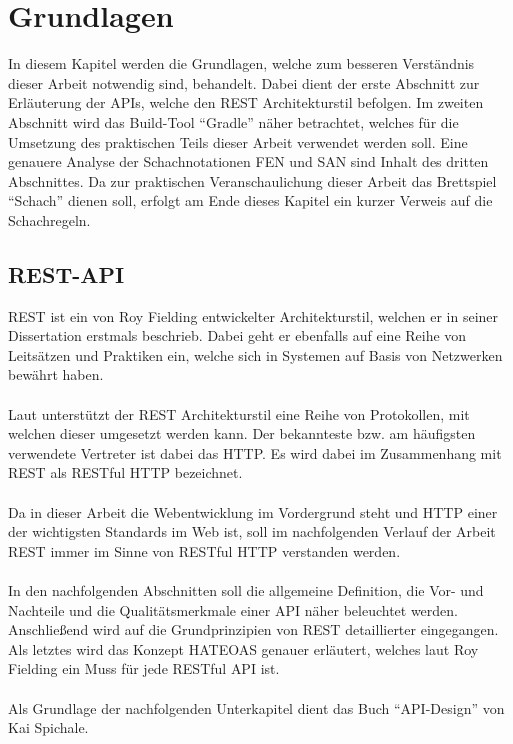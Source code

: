 
\chapter{Grundlagen}\label{chap:basics}
In diesem Kapitel werden die Grundlagen, welche zum besseren Verständnis dieser Arbeit notwendig sind, behandelt. Dabei dient der erste Abschnitt zur Erläuterung der \glspl{API}, welche den \gls{REST} Architekturstil befolgen. Im zweiten Abschnitt wird das Build-Tool \enquote{Gradle} näher betrachtet, welches für die Umsetzung des praktischen Teils dieser Arbeit verwendet werden soll. Eine genauere Analyse der Schachnotationen \gls{FEN} und \gls{SAN} sind Inhalt des dritten Abschnittes. Da zur praktischen Veranschaulichung dieser Arbeit das Brettspiel \enquote{Schach} dienen soll, erfolgt am Ende dieses Kapitel ein kurzer Verweis auf die Schachregeln.

\section{REST-API}
\gls{REST} ist ein von Roy Fielding entwickelter Architekturstil, welchen er in seiner Dissertation \cite{dissertationFielding} erstmals beschrieb. Dabei geht er ebenfalls auf eine Reihe von Leitsätzen und Praktiken ein, welche sich in Systemen auf Basis von Netzwerken bewährt haben.\\
\\
Laut \cite[143]{apiDesign} unterstützt der \gls{REST} Architekturstil eine Reihe von Protokollen, mit welchen dieser umgesetzt werden kann. Der bekannteste bzw. am häufigsten verwendete Vertreter ist dabei das \gls{HTTP}. Es wird dabei im Zusammenhang mit \gls{REST} als \gls{REST}ful \gls{HTTP} bezeichnet. \\
\\
Da in dieser Arbeit die Webentwicklung im Vordergrund steht und \gls{HTTP} einer der wichtigsten Standards im Web ist, soll im nachfolgenden Verlauf der Arbeit \gls{REST} immer im Sinne von RESTful \gls{HTTP} verstanden werden.\\
\\
In den nachfolgenden Abschnitten soll die allgemeine Definition, die Vor- und Nachteile und die Qualitätsmerkmale einer \gls{API} näher beleuchtet werden. Anschließend wird auf die Grundprinzipien von \gls{REST} detaillierter eingegangen. Als letztes wird das Konzept HATEOAS genauer erläutert, welches laut Roy Fielding ein Muss \cite{restMustBeHypertextDriven} für jede RESTful \gls{API} ist.\\
\\
Als Grundlage der nachfolgenden Unterkapitel dient das Buch \enquote{API-Design} \cite[7-10, 13-14, 144-148, 189]{apiDesign} von Kai Spichale.

